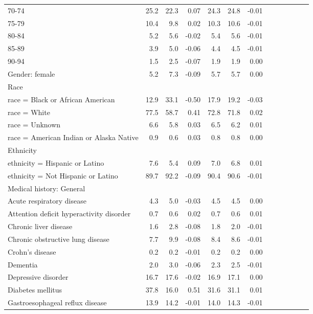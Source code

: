 \documentclass[11pt,]{article}
\begin{document}
\begin{longtable}{lrrrrrrrrrrrr}
      70-74 & 25.2 & 22.3 &  0.07 & 24.3 & 24.8 & -0.01 \\ 
      75-79 & 10.4 &  9.8 &  0.02 & 10.3 & 10.6 & -0.01 \\ 
      80-84 &  5.2 &  5.6 & -0.02 &  5.4 &  5.6 & -0.01 \\ 
      85-89 &  3.9 &  5.0 & -0.06 &  4.4 &  4.5 & -0.01 \\ 
      90-94 &  1.5 &  2.5 & -0.07 &  1.9 &  1.9 &  0.00 \\ 
  Gender: female &  5.2 &  7.3 & -0.09 &  5.7 &  5.7 &  0.00 \\ 
  Race &    &    &     &    &    &     \\ 
      race = Black or African American & 12.9 & 33.1 & -0.50 & 17.9 & 19.2 & -0.03 \\ 
      race = White & 77.5 & 58.7 &  0.41 & 72.8 & 71.8 &  0.02 \\ 
      race = Unknown &  6.6 &  5.8 &  0.03 &  6.5 &  6.2 &  0.01 \\ 
      race = American Indian or Alaska Native &  0.9 &  0.6 &  0.03 &  0.8 &  0.8 &  0.00 \\ 
  Ethnicity &    &    &     &    &    &     \\ 
      ethnicity = Hispanic or Latino &  7.6 &  5.4 &  0.09 &  7.0 &  6.8 &  0.01 \\ 
      ethnicity = Not Hispanic or Latino & 89.7 & 92.2 & -0.09 & 90.4 & 90.6 & -0.01 \\ 
  Medical history: General &    &    &     &    &    &     \\ 
      Acute respiratory disease &  4.3 &  5.0 & -0.03 &  4.5 &  4.5 &  0.00 \\ 
      Attention deficit hyperactivity disorder &  0.7 &  0.6 &  0.02 &  0.7 &  0.6 &  0.01 \\ 
      Chronic liver disease &  1.6 &  2.8 & -0.08 &  1.8 &  2.0 & -0.01 \\ 
      Chronic obstructive lung disease &  7.7 &  9.9 & -0.08 &  8.4 &  8.6 & -0.01 \\ 
      Crohn's disease &  0.2 &  0.2 & -0.01 &  0.2 &  0.2 &  0.00 \\ 
      Dementia &  2.0 &  3.0 & -0.06 &  2.3 &  2.5 & -0.01 \\ 
      Depressive disorder & 16.7 & 17.6 & -0.02 & 16.9 & 17.1 &  0.00 \\ 
      Diabetes mellitus & 37.8 & 16.0 &  0.51 & 31.6 & 31.1 &  0.01 \\ 
      Gastroesophageal reflux disease & 13.9 & 14.2 & -0.01 & 14.0 & 14.3 & -0.01 \\ 

\end{longtable}
\end{document}
